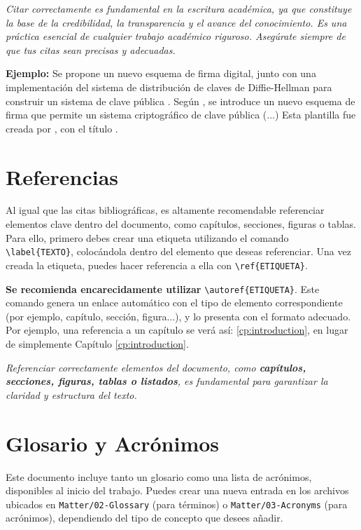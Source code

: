 \begin{block}[tip]
\textit{Citar correctamente es fundamental en la escritura académica, ya que constituye la base de la credibilidad, la transparencia y el avance del conocimiento. Es una práctica esencial de cualquier trabajo académico riguroso. Asegúrate siempre de que tus citas sean precisas y adecuadas.}
\end{block}

\noindent\textbf{Ejemplo:} Se propone un nuevo esquema de firma digital, junto con una implementación del sistema de distribución de claves de Diffie-Hellman para construir un sistema de clave pública \citep{Elgamal1985}. Según \citet{Elgamal1985}, se introduce un nuevo esquema de firma que permite un sistema criptográfico de clave pública (...) Esta plantilla fue creada por \citeauthor{UMU_Thesis}, con el título .

\section{Referencias}

Al igual que las citas bibliográficas, es altamente recomendable referenciar elementos clave dentro del documento, como capítulos, secciones, figuras o tablas. Para ello, primero debes crear una etiqueta utilizando el comando \verb|\label{TEXTO}|, colocándola dentro del elemento que deseas referenciar. Una vez creada la etiqueta, puedes hacer referencia a ella con \verb|\ref{ETIQUETA}|.

\textbf{Se recomienda encarecidamente utilizar} \verb|\autoref{ETIQUETA}|. Este comando genera un enlace automático con el tipo de elemento correspondiente (por ejemplo, capítulo, sección, figura...), y lo presenta con el formato adecuado. Por ejemplo, una referencia a un capítulo se verá así: \autoref{cp:introduction}, en lugar de simplemente Capítulo \ref{cp:introduction}.

\begin{block}[tip]
\textit{Referenciar correctamente elementos del documento, como \textbf{capítulos, secciones, figuras, tablas o listados}, es fundamental para garantizar la claridad y estructura del texto.}
\end{block}

\section{Glosario y Acrónimos}

Este documento incluye tanto un glosario como una lista de acrónimos, disponibles al inicio del trabajo. Puedes crear una nueva entrada en los archivos ubicados en \verb|Matter/02-Glossary| (para términos) o \verb|Matter/03-Acronyms| (para acrónimos), dependiendo del tipo de concepto que desees añadir.


